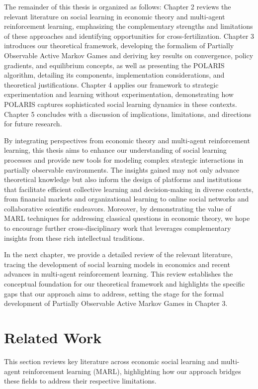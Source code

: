\documentclass[a4paper,12pt]{report}
\begin{document}
The remainder of this thesis is organized as follows: Chapter 2 reviews the relevant literature on social learning in economic theory and multi-agent reinforcement learning, emphasizing the complementary strengths and limitations of these approaches and identifying opportunities for cross-fertilization. Chapter 3 introduces our theoretical framework, developing the formalism of Partially Observable Active Markov Games and deriving key results on convergence, policy gradients, and equilibrium concepts, as well as presenting the POLARIS algorithm, detailing its components, implementation considerations, and theoretical justifications. Chapter 4 applies our framework to strategic experimentation and learning without experimentation, demonstrating how POLARIS captures sophisticated social learning dynamics in these contexts. Chapter 5 concludes with a discussion of implications, limitations, and directions for future research.

By integrating perspectives from economic theory and multi-agent reinforcement learning, this thesis aims to enhance our understanding of social learning processes and provide new tools for modeling complex strategic interactions in partially observable environments. The insights gained may not only advance theoretical knowledge but also inform the design of platforms and institutions that facilitate efficient collective learning and decision-making in diverse contexts, from financial markets and organizational learning to online social networks and collaborative scientific endeavors. Moreover, by demonstrating the value of MARL techniques for addressing classical questions in economic theory, we hope to encourage further cross-disciplinary work that leverages complementary insights from these rich intellectual traditions.

In the next chapter, we provide a detailed review of the relevant literature, tracing the development of social learning models in economics and recent advances in multi-agent reinforcement learning. This review establishes the conceptual foundation for our theoretical framework and highlights the specific gaps that our approach aims to address, setting the stage for the formal development of Partially Observable Active Markov Games in Chapter 3.
\chapter{Related Work}
This section reviews key literature across economic social learning and multi-agent reinforcement learning (MARL), highlighting how our approach bridges these fields to address their respective limitations.
\end{document}
